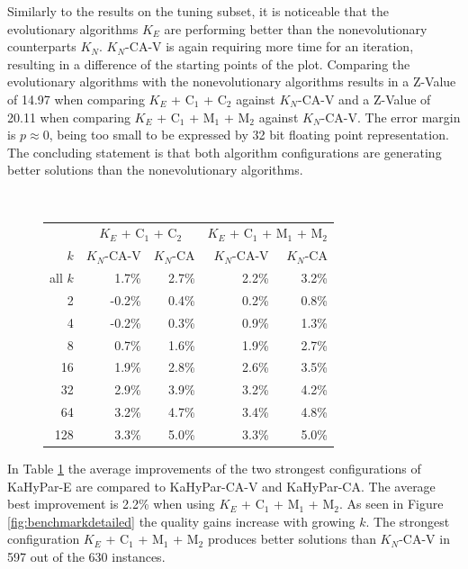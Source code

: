 \documentclass[a4paper,12pt,titlepage, BCOR7mm,headsepline]{scrbook}
\numberwithin{equation}{section}
\begin{document}
Similarly to the results on the tuning subset, it is noticeable that the evolutionary algorithms $K_E$ are performing better than the nonevolutionary counterparts $K_N$. $K_N$-CA-V is again requiring more time for an iteration, resulting in a difference of the starting points of the plot. Comparing the evolutionary algorithms with the nonevolutionary algorithms results in a Z-Value of 14.97 when comparing $K_E$ + C$_1$ + C$_2$ against $K_N$-CA-V and a Z-Value of 20.11 when comparing $K_E$ + C$_1$ + M$_1$ + M$_2$ against $K_N$-CA-V. The error margin is $p \approx 0$, being too small to be expressed by 32 bit floating point representation.  
The concluding statement is that both algorithm configurations are generating better solutions than the nonevolutionary algorithms. 
\begin{figure}[H]


\centering
\vspace{0pt}
~\label{tbl:imp}
\begin{tabular}[H]{r||r|r||r|r}\label{tab:improvement}
&\multicolumn{2}{c||}{$K_E$ + C$_1$ + C$_2$} & \multicolumn{2}{c}{$K_E$ + C$_1$ + M$_1$ + M$_2$} \\
$k$                     &                              $K_N$-CA-V    & $K_N$-CA &  $K_N$-CA-V  & $K_N$-CA  \\ 
                     \hline
                     \hline

all $k$ &  1.7\% & 2.7\% & 2.2\% & 3.2\% \\
\hline
2&-0.2\% & 0.4\% & 0.2\% & 0.8\% \\
4& -0.2\% &0.3\% &0.9\% &1.3\%\\
8& 0.7\% &1.6\%& 1.9\% &2.7\%\\
16& 1.9\% &2.8\%& 2.6\%& 3.5\%\\
32& 2.9\% &3.9\%& 3.2\%& 4.2\%\\
64&  3.2\% &4.7\%& 3.4\% &4.8\%\\
128&%
      3.3\%
&5.0\%
& 3.3\% &5.0\% \\ 
\end{tabular}

\end{figure}
In Table  \ref{tab:improvement} the average improvements of the two strongest configurations of KaHyPar-E are compared to KaHyPar-CA-V and KaHyPar-CA. The average best improvement is 2.2\% when using $K_E$ + C$_1$ + M$_1$ + M$_2$. As seen in Figure \ref{fig:benchmarkdetailed} the quality gains increase with growing $k$. The strongest configuration $K_E$ + C$_1$ + M$_1$ + M$_2$ produces better solutions than $K_N$-CA-V in 597 out of the 630 instances. 
\end{document}
